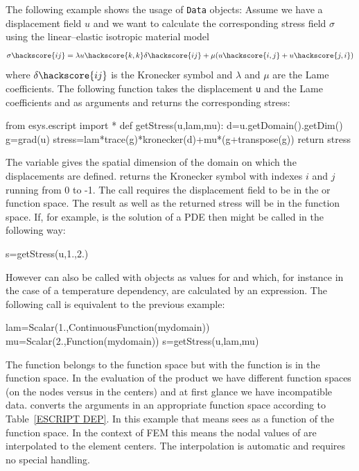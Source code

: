 The following example shows the usage of {\tt Data} objects: Assume we have a
displacement field $u$ and we want to calculate the corresponding stress field
$\sigma$ using the linear--elastic isotropic material model
\begin{eqnarray}\label{eq: linear elastic stress}
\sigma\hackscore {ij}=\lambda u\hackscore {k,k} \delta\hackscore {ij} + \mu ( u\hackscore {i,j} + u\hackscore {j,i})
\end{eqnarray}
where $\delta\hackscore {ij}$ is the Kronecker symbol and 
$\lambda$ and $\mu$ are the Lame coefficients. The following function
takes the displacement {\tt u} and the Lame coefficients
 and  as arguments and returns the corresponding stress:
\begin{python}
  from esys.escript import *
  def getStress(u,lam,mu):
    d=u.getDomain().getDim()
    g=grad(u)
    stress=lam*trace(g)*kronecker(d)+mu*(g+transpose(g))
    return stress     
\end{python}
The variable 
 gives the spatial dimension of the 
domain on which the displacements are defined.
 returns the Kronecker symbol with indexes 
$i$ and $j$ running from $0$ to -1. The call  requires 
the displacement field  to be in the  or \ContinuousFunction
function space. The result  as well as the returned stress will be in the \Function function space. 
If, for example,  is the solution of a PDE then  might be called
in the following way:
\begin{python}
  s=getStress(u,1.,2.)
\end{python}
However  can also be called with \Data objects as values for
 and  which,
for instance in the case of a temperature dependency, are calculated by an expression. 
The following call is equivalent to the previous example:
\begin{python}
  lam=Scalar(1.,ContinuousFunction(mydomain))
  mu=Scalar(2.,Function(mydomain))
  s=getStress(u,lam,mu)
\end{python}

The function  belongs to the \ContinuousFunction function space
but with  the function  is in the \Function function space.
In the evaluation of the product  we have different function
spaces (on the nodes versus in the centers) and at first glance we have incompatible data.
\escript converts the arguments in an appropriate function space according to
Table~\ref{ESCRIPT DEP}. In this example that means
\escript sees  as a function of the \Function function space. 
In the context of FEM this means the nodal values of 
 are interpolated to the element centers.
The interpolation is automatic and requires no special handling.

